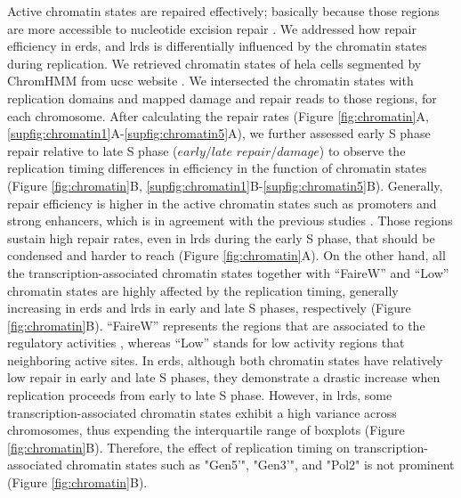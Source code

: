 Active chromatin states are repaired effectively; basically because those regions are more accessible to nucleotide excision repair \citep{adar2016genome}. We addressed how repair efficiency in \gls{erd}s, and \gls{lrd}s is differentially influenced by the chromatin states during replication. We retrieved chromatin states of \gls{hela} cells segmented by ChromHMM from \gls{ucsc} website \citep{ernst2017chromatin}. We intersected the chromatin states with replication domains and mapped damage and repair reads to those regions, for each chromosome. After calculating the repair rates (Figure \ref{fig:chromatin}A, \ref{supfig:chromatin1}A-\ref{supfig:chromatin5}A), we further assessed early S phase repair relative to late S phase (\(early/late\) \(repair/damage\)) to observe the replication timing differences in efficiency in the function of chromatin states (Figure \ref{fig:chromatin}B, \ref{supfig:chromatin1}B-\ref{supfig:chromatin5}B). Generally, repair efficiency is higher in the active chromatin states such as promoters and strong enhancers, which is in agreement with the previous studies \citep{adar2016genome, hu2016cisplatin}. Those regions sustain high repair rates, even in \gls{lrd}s during the early S phase, that should be condensed and harder to reach (Figure \ref{fig:chromatin}A). On the other hand, all the transcription-associated chromatin states together with “FaireW” and “Low” chromatin states are highly affected by the replication timing, generally increasing in \gls{erd}s and \gls{lrd}s in early and late S phases, respectively (Figure \ref{fig:chromatin}B). “FaireW” represents the regions that are associated to the regulatory activities \citep{giresi2007faire}, whereas “Low” stands for low activity regions that neighboring active sites. In \gls{erd}s, although both chromatin states have relatively low repair in early and late S phases, they demonstrate a drastic increase when replication proceeds from early to late S phase.  However, in \gls{lrd}s, some transcription-associated chromatin states exhibit a high variance across chromosomes, thus expending the interquartile range of boxplots (Figure \ref{fig:chromatin}B). Therefore, the effect of replication timing on transcription-associated chromatin states such as "Gen5'", "Gen3'", and "Pol2" is not prominent (Figure \ref{fig:chromatin}B).

